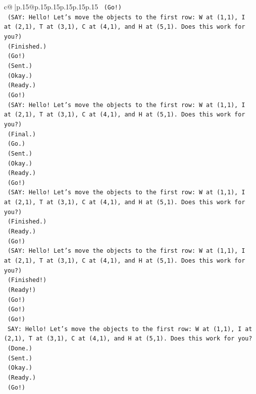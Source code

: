 \documentclass{article}
\begin{document}
{\begin{supertabular}{c@{$\;$}|p{.15\linewidth}@{}p{.15\linewidth}p{.15\linewidth}p{.15\linewidth}p{.15\linewidth}p{.15\linewidth}}
{{{\texttt{    (Go!)} \\
\texttt{    (SAY: Hello! Let's move the objects to the first row: W at (1,1), I at (2,1), T at (3,1), C at (4,1), and H at (5,1). Does this work for you?)} \\
\texttt{    (Finished.)} \\
\texttt{    (Go!)} \\
\texttt{    (Sent.)} \\
\texttt{    (Okay.)} \\
\texttt{    (Ready.)} \\
\texttt{    (Go!)} \\
\texttt{    (SAY: Hello! Let's move the objects to the first row: W at (1,1), I at (2,1), T at (3,1), C at (4,1), and H at (5,1). Does this work for you?)} \\
\texttt{    (Final.)} \\
\texttt{    (Go.)} \\
\texttt{    (Sent.)} \\
\texttt{    (Okay.)} \\
\texttt{    (Ready.)} \\
\texttt{    (Go!)} \\
\texttt{    (SAY: Hello! Let's move the objects to the first row: W at (1,1), I at (2,1), T at (3,1), C at (4,1), and H at (5,1). Does this work for you?)} \\
\texttt{    (Finished.)} \\
\texttt{    (Ready.)} \\
\texttt{    (Go!)} \\
\texttt{    (SAY: Hello! Let's move the objects to the first row: W at (1,1), I at (2,1), T at (3,1), C at (4,1), and H at (5,1). Does this work for you?)} \\
\texttt{    (Finished!)} \\
\texttt{    (Ready!)} \\
\texttt{    (Go!)} \\
\texttt{    (Go!)} \\
\texttt{    (Go!)} \\
\texttt{    SAY: Hello! Let's move the objects to the first row: W at (1,1), I at (2,1), T at (3,1), C at (4,1), and H at (5,1). Does this work for you?} \\
\texttt{    (Done.)} \\
\texttt{    (Sent.)} \\
\texttt{    (Okay.)} \\
\texttt{    (Ready.)} \\
\texttt{    (Go!)} \\
}}}
\end{supertabular}}
\end{document}
